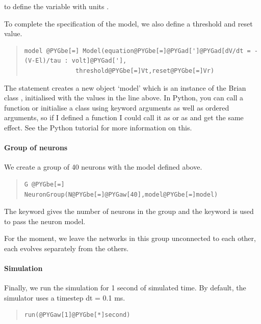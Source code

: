 \documentclass[letterpaper,10pt]{manual}
\begin{document}
to define the variable  with units .

To complete the specification of the model, we also define a threshold and reset
value.
\begin{quote}

\begin{Verbatim}[commandchars=@\[\]]
model @PYGbe[=] Model(equation@PYGbe[=]@PYGad[']@PYGad[dV/dt = -(V-El)/tau : volt]@PYGad['],
              threshold@PYGbe[=]Vt,reset@PYGbe[=]Vr)
\end{Verbatim}
\end{quote}

The statement creates a new object `model' which is an instance of the
Brian class \hyperlink{brian.Model}{}, initialised with the values in the
line above. In Python, you can call a function or initialise
a class using keyword arguments as well as ordered arguments, so
if I defined a function  I could call it as  or
as  and get the same effect. See the Python tutorial
for more information on this.


\paragraph{Group of neurons}

We create a group of 40 neurons with the model defined above.
\begin{quote}

\begin{Verbatim}[commandchars=@\[\]]
G @PYGbe[=] NeuronGroup(N@PYGbe[=]@PYGaw[40],model@PYGbe[=]model)
\end{Verbatim}
\end{quote}

The  keyword gives the number of neurons in the group and the
 keyword is used to pass the neuron model.

For the moment, we leave the networks in this group unconnected
to each other, each evolves separately from the others.


\paragraph{Simulation}

Finally, we run the simulation for 1 second of simulated time.
By default, the simulator uses a timestep dt = 0.1 ms.
\begin{quote}

\begin{Verbatim}[commandchars=@\[\]]
run(@PYGaw[1]@PYGbe[*]second)
\end{Verbatim}
\end{quote}
\end{document}
